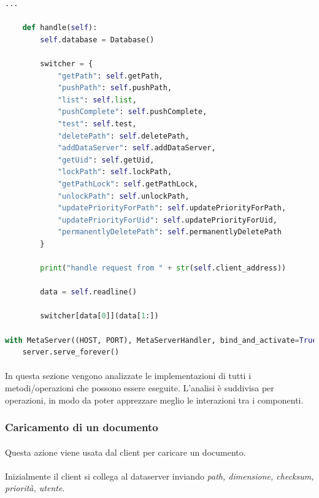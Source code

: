 \documentclass[11pt,a4paper,english]{article}
\begin{document}
\begin{lstlisting}[language=Python, title=Metaserver e relativo handler]
    ...
    
    def handle(self):
        self.database = Database()

        switcher = {
            "getPath": self.getPath,
            "pushPath": self.pushPath,
            "list": self.list,
            "pushComplete": self.pushComplete,
            "test": self.test,
            "deletePath": self.deletePath,
            "addDataServer": self.addDataServer,
            "getUid": self.getUid,
            "lockPath": self.lockPath,
            "getPathLock": self.getPathLock,
            "unlockPath": self.unlockPath,
            "updatePriorityForPath": self.updatePriorityForPath,
            "updatePriorityForUid": self.updatePriorityForUid,
            "permanentlyDeletePath": self.permanentlyDeletePath
        }

        print("handle request from " + str(self.client_address))

        data = self.readline()

        switcher[data[0]](data[1:])

with MetaServer((HOST, PORT), MetaServerHandler, bind_and_activate=True) as server:
    server.serve_forever()
\end{lstlisting}

\paragraph{} In questa sezione vengono analizzate le implementazioni di tutti i metodi/operazioni che possono essere eseguite. L'analisi è suddivisa per operazioni, in modo da poter apprezzare meglio le interazioni tra i componenti. 

\subsubsection{Caricamento di un documento}

\paragraph{} Questa azione viene usata dal client per caricare un documento.

\paragraph{} Inizialmente il client si collega al dataserver inviando \emph{path, dimensione, checksum, priorità, utente}.
\end{document}

